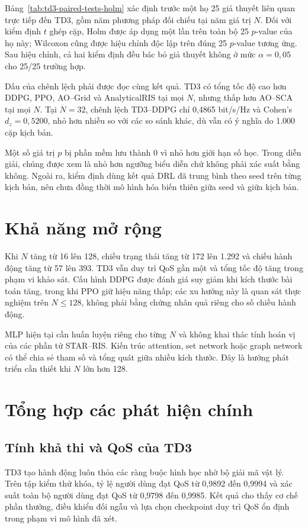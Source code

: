 Bảng~\ref{tab:td3-paired-tests-holm} xác định trước một họ 25 giả thuyết liên quan trực tiếp đến TD3, gồm năm phương pháp đối chiếu tại năm giá trị $N$. Đối với kiểm định $t$ ghép cặp, Holm được áp dụng một lần trên toàn bộ 25 $p$-value của họ này; Wilcoxon cũng được hiệu chỉnh độc lập trên đúng 25 $p$-value tương ứng. Sau hiệu chỉnh, cả hai kiểm định đều bác bỏ giả thuyết không ở mức $\alpha=0{,}05$ cho 25/25 trường hợp.

Dấu của chênh lệch phải được đọc cùng kết quả. TD3 có tổng tốc độ cao hơn DDPG, PPO, AO--Grid và AnalyticalRIS tại mọi $N$, nhưng thấp hơn AO--SCA tại mọi $N$. Tại $N=32$, chênh lệch TD3--DDPG chỉ 0,4865 bit/s/Hz và Cohen's $d_z=0,5200$, nhỏ hơn nhiều so với các so sánh khác, dù vẫn có ý nghĩa do 1.000 cặp kịch bản.

Một số giá trị $p$ bị phần mềm lưu thành 0 vì nhỏ hơn giới hạn số học. Trong diễn giải, chúng được xem là nhỏ hơn ngưỡng biểu diễn chứ không phải xác suất bằng không. Ngoài ra, kiểm định dùng kết quả DRL đã trung bình theo seed trên từng kịch bản, nên chưa đồng thời mô hình hóa biến thiên giữa seed và giữa kịch bản.



\section{Khả năng mở rộng}
Khi $N$ tăng từ 16 lên 128, chiều trạng thái tăng từ 172 lên 1.292 và chiều hành động tăng từ 57 lên 393. TD3 vẫn duy trì QoS gần một và tổng tốc độ tăng trong phạm vi khảo sát. Cấu hình DDPG được đánh giá suy giảm khi kích thước bài toán tăng, trong khi PPO giữ hiệu năng thấp; các xu hướng này là quan sát thực nghiệm trên $N\le128$, không phải bằng chứng nhân quả riêng cho số chiều hành động.

MLP hiện tại cần huấn luyện riêng cho từng $N$ và không khai thác tính hoán vị của các phần tử STAR--RIS. Kiến trúc attention, set network hoặc graph network có thể chia sẻ tham số và tổng quát giữa nhiều kích thước. Đây là hướng phát triển cần thiết khi $N$ lớn hơn 128.

\section{Tổng hợp các phát hiện chính}
\subsection{Tính khả thi và QoS của TD3}
TD3 tạo hành động luôn thỏa các ràng buộc hình học nhờ bộ giải mã vật lý. Trên tập kiểm thử khóa, tỷ lệ người dùng đạt QoS từ 0,9892 đến 0,9994 và xác suất toàn bộ người dùng đạt QoS từ 0,9798 đến 0,9985. Kết quả cho thấy cơ chế phần thưởng, điều khiển đối ngẫu và lựa chọn checkpoint duy trì QoS ổn định trong phạm vi mô hình đã xét.

